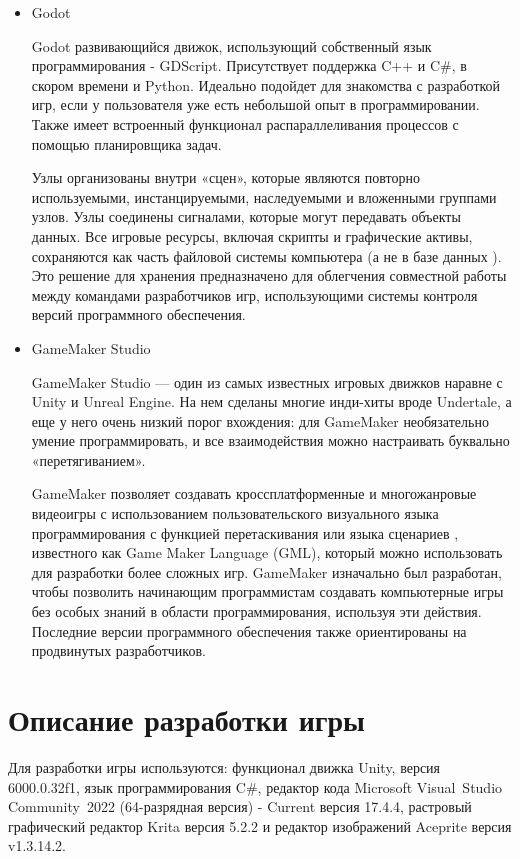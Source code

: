 \documentclass[bachelor, och, coursework, times]{SCWorks}
\begin{document}
\begin{itemize}
\item Godot

Godot развивающийся движок, использующий собственный язык программирования - GDScript. 
Присутствует поддержка C++ и C\#, в скором времени и Python. 
Идеально подойдет для знакомства с разработкой игр, 
если у пользователя уже есть небольшой опыт в программировании. 
Также имеет встроенный функционал распараллеливания процессов 
с помощью планировщика задач. 

Узлы организованы внутри «сцен», которые являются повторно используемыми, инстанцируемыми, 
наследуемыми и вложенными группами узлов. Узлы соединены сигналами, 
которые могут передавать объекты данных. Все игровые ресурсы, включая скрипты и графические активы, 
сохраняются как часть файловой системы компьютера (а не в базе данных ). 
Это решение для хранения предназначено для облегчения совместной работы 
между командами разработчиков игр, использующими системы контроля версий программного обеспечения.\cite{search4}

\item GameMaker Studio

GameMaker Studio — один из самых известных игровых движков 
наравне с Unity и Unreal Engine.
 На нем сделаны многие инди-хиты вроде Undertale,
  а еще у него очень низкий порог вхождения: 
  для GameMaker необязательно умение программировать, 
  и все взаимодействия можно настраивать буквально «перетягиванием».

GameMaker позволяет создавать кроссплатформенные и многожанровые видеоигры 
с использованием пользовательского визуального языка программирования 
с функцией перетаскивания или языка сценариев , известного как Game Maker Language (GML), 
который можно использовать для разработки более сложных игр. 
GameMaker изначально был разработан, 
чтобы позволить начинающим программистам создавать компьютерные игры без особых знаний 
в области программирования, используя эти действия. 
Последние версии программного обеспечения также ориентированы на продвинутых разработчиков.\cite{gamemakerstudio}
 \end{itemize}

\section{Описание разработки игры}

    Для разработки игры используются: функционал движка Unity, версия 6000.0.32f1, 
    язык программирования C\#, редактор кода Microsoft Visual Studio Community 2022 
    (64-разрядная версия) - Current версия 17.4.4, растровый графический редактор Krita версия 5.2.2
    и редактор изображений Aceprite версия v1.3.14.2.
\end{document}
